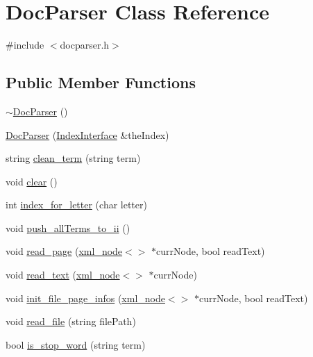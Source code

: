 \hypertarget{class_doc_parser}{}\section{Doc\+Parser Class Reference}
\label{class_doc_parser}


{\ttfamily \#include $<$docparser.\+h$>$}

\subsection*{Public Member Functions}
\begin{DoxyCompactItemize}
\item 
\hyperlink{class_doc_parser_a637fc4d565eaf2927ee9b88bbe23e3cb}{$\sim$\+Doc\+Parser} ()
\item 
\hyperlink{class_doc_parser_a086f00e54fca8038c85c0e235948d75a}{Doc\+Parser} (\hyperlink{class_index_interface}{Index\+Interface} \&the\+Index)
\item 
string \hyperlink{class_doc_parser_a1b127af53e8af16f393b64f46c307d3a}{clean\+\_\+term} (string term)
\item 
void \hyperlink{class_doc_parser_ad92d1a6da7d413abd27ee18a6ed20a30}{clear} ()
\item 
int \hyperlink{class_doc_parser_a7addc81ac337c2688bb9e9d8197db2fc}{index\+\_\+for\+\_\+letter} (char letter)
\item 
void \hyperlink{class_doc_parser_ac5fbdbda41119634a1357112f158110c}{push\+\_\+all\+Terms\+\_\+to\+\_\+ii} ()
\item 
void \hyperlink{class_doc_parser_a48cd3949baca573b9be0b4ba24b9c79d}{read\+\_\+page} (\hyperlink{classrapidxml_1_1xml__node}{xml\+\_\+node}$<$$>$ $\ast$curr\+Node, bool read\+Text)
\item 
void \hyperlink{class_doc_parser_af28153ebf0ee2fe97c2942c04c915adc}{read\+\_\+text} (\hyperlink{classrapidxml_1_1xml__node}{xml\+\_\+node}$<$$>$ $\ast$curr\+Node)
\item 
void \hyperlink{class_doc_parser_ad7b5809e4efd3e2bae781c1cb491ab29}{init\+\_\+file\+\_\+page\+\_\+infos} (\hyperlink{classrapidxml_1_1xml__node}{xml\+\_\+node}$<$$>$ $\ast$curr\+Node, bool read\+Text)
\item 
void \hyperlink{class_doc_parser_a45860ee7fb0b956c4342cd4a815818de}{read\+\_\+file} (string file\+Path)
\item 
bool \hyperlink{class_doc_parser_ad30c49de12ed45eaf2594c4718789c3e}{is\+\_\+stop\+\_\+word} (string term)
\end{DoxyCompactItemize}

